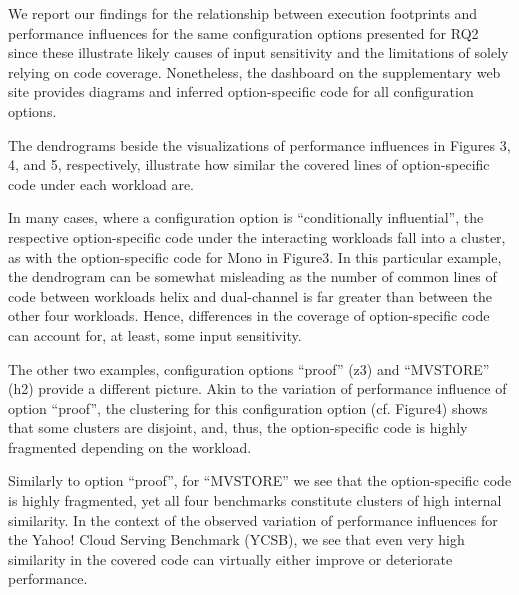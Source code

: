 {{We report our findings for the relationship between execution footprints and performance influences for the same configuration options presented for RQ2 since these illustrate likely causes of input sensitivity and the limitations of solely relying on code coverage. Nonetheless, the dashboard on the supplementary web site provides diagrams and inferred option-specific code for all configuration options. 

The dendrograms beside the visualizations of performance influences in Figures 3, 4, and 5, respectively, illustrate how similar the covered lines of option-specific code under each workload are. 

In many cases, where  a configuration option is “conditionally influential”, the respective option-specific code under the interacting workloads fall into a cluster, as with the option-specific code for Mono in Figure3. In this particular example, the dendrogram can be somewhat misleading as the number of common lines of code between workloads helix and dual-channel is far greater than between the other four workloads. Hence, differences in the coverage of option-specific code can account for, at least, some input sensitivity.

The other two examples, configuration options “proof” (z3) and “MVSTORE” (h2) provide a different picture. Akin to the variation of performance influence of option “proof”, the clustering for this configuration option (cf. Figure4) shows that some clusters are disjoint, and, thus, the option-specific code is highly fragmented depending on the workload. 

Similarly to option “proof”, for “MVSTORE” we see that the option-specific code is highly fragmented, yet all four benchmarks constitute clusters of high internal similarity. In the context of the observed variation of performance influences for the Yahoo! Cloud Serving Benchmark (YCSB), we see that even very high similarity in the covered code can virtually either improve or deteriorate performance.

}
}
